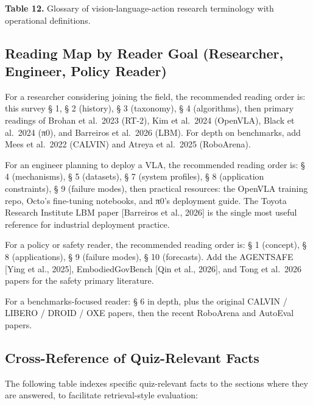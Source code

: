\textbf{Table 12.} Glossary of vision-language-action research terminology with operational definitions.

\subsection{Reading Map by Reader Goal (Researcher, Engineer, Policy Reader)}\label{reading-map-by-reader-goal-researcher-engineer-policy-reader}

For a researcher considering joining the field, the recommended reading order is: this survey § 1, § 2 (history), § 3 (taxonomy), § 4 (algorithms), then primary readings of Brohan et al.~2023 (RT-2), Kim et al.~2024 (OpenVLA), Black et al.~2024 (π0), and Barreiros et al.~2026 (LBM). For depth on benchmarks, add Mees et al.~2022 (CALVIN) and Atreya et al.~2025 (RoboArena).

For an engineer planning to deploy a VLA, the recommended reading order is: § 4 (mechanisms), § 5 (datasets), § 7 (system profiles), § 8 (application constraints), § 9 (failure modes), then practical resources: the OpenVLA training repo, Octo's fine-tuning notebooks, and π0's deployment guide. The Toyota Research Institute LBM paper {[}Barreiros et al., 2026{]} is the single most useful reference for industrial deployment practice.

For a policy or safety reader, the recommended reading order is: § 1 (concept), § 8 (applications), § 9 (failure modes), § 10 (forecasts). Add the AGENTSAFE {[}Ying et al., 2025{]}, EmbodiedGovBench {[}Qin et al., 2026{]}, and Tong et al.~2026 papers for the safety primary literature.

For a benchmarks-focused reader: § 6 in depth, plus the original CALVIN / LIBERO / DROID / OXE papers, then the recent RoboArena and AutoEval papers.

\subsection{Cross-Reference of Quiz-Relevant Facts}\label{cross-reference-of-quiz-relevant-facts}

The following table indexes specific quiz-relevant facts to the sections where they are answered, to facilitate retrieval-style evaluation:

